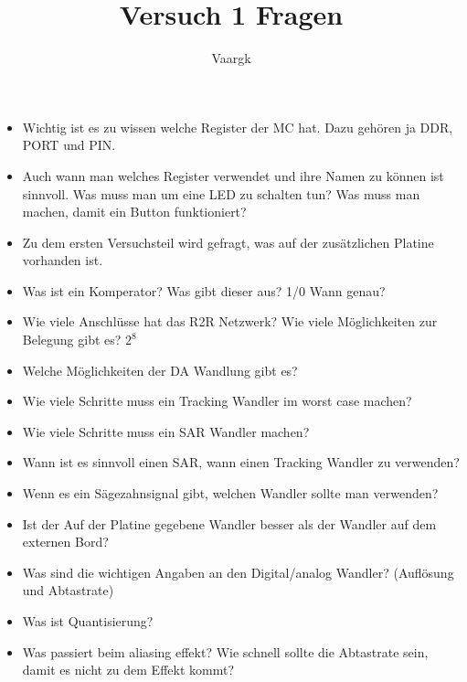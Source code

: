 \documentclass[12pt,a4paper]{article}
\title{Versuch 1 Fragen}
\author{
        Vaargk
}
\begin{document}
\maketitle
\begin{itemize}
    \item Wichtig ist es zu wissen welche Register der MC hat. Dazu gehören ja DDR, PORT und PIN.
    \item Auch wann man welches Register verwendet und ihre Namen zu können ist sinnvoll. Was muss man um eine LED zu schalten tun? Was muss man machen, damit ein Button funktioniert?
    \item Zu dem ersten Versuchsteil wird gefragt, was auf der zusätzlichen Platine vorhanden ist.
    \item Was ist ein Komperator? Was gibt dieser aus? 1/0 Wann genau?
    \item Wie viele Anschlüsse hat das R2R Netzwerk? Wie viele Möglichkeiten zur Belegung gibt es? $2^8$
    \item Welche Möglichkeiten der DA Wandlung gibt es? 
    \item Wie viele Schritte muss ein Tracking Wandler im worst case machen?
    \item Wie viele Schritte muss ein SAR Wandler machen?
    \item Wann ist es sinnvoll einen SAR, wann einen Tracking Wandler zu verwenden?
    \item Wenn es ein Sägezahnsignal gibt, welchen Wandler sollte man verwenden?
    \item Ist der Auf der Platine gegebene Wandler besser als der Wandler auf dem externen Bord?
    \item Was sind die wichtigen Angaben an den Digital/analog Wandler? (Auflösung und Abtastrate)
    \item Was ist Quantisierung?
    \item Was passiert beim aliasing effekt? Wie schnell sollte die Abtastrate sein, damit es nicht zu dem Effekt kommt?
\end{itemize}
\end{document}
